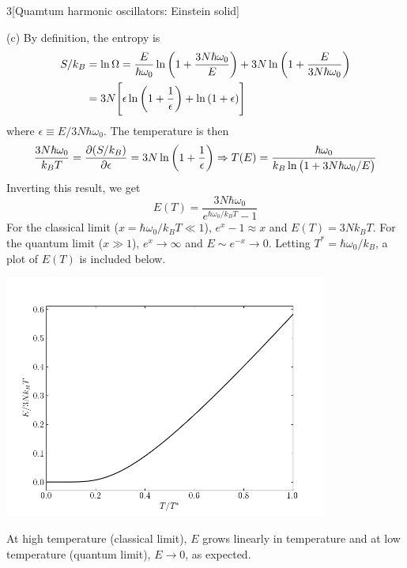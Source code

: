 \documentclass[12pt]{article}
\begin{document}
\begin{problem}{3}[Quamtum harmonic oscillators: Einstein solid]
\begin{solution}
(c) By definition, the entropy is
\begin{align}
    S/k_B
    &=\ln\Omega=\frac{E}{\hbar\omega_0}\ln\qty(1+\frac{3N\hbar\omega_0}{E})
    +3N\ln\qty(1+\frac{E}{3N\hbar\omega_0})\notag\\
    &=3N\qty[\epsilon\ln\qty(1+\frac{1}{\epsilon})+\ln\qty(1+\epsilon)]
\end{align}
where $\epsilon\equiv E/3N\hbar\omega_0$. The temperature is then
\begin{equation}
    \frac{3N\hbar\omega_0}{k_BT}=\frac{\partial(S/k_B)}{\partial\epsilon}
    =3N\ln\qty(1+\frac1\epsilon)
    \Rightarrow T(E)=\frac{\hbar\omega_0}{k_B\ln\qty(1+3N\hbar\omega_0/E)}
\end{equation}
Inverting this result, we get
\begin{equation}
    E(T)=\frac{3N\hbar\omega_0}{e^{\hbar\omega_0/k_BT}-1}
\end{equation}
For the classical limit ($x=\hbar\omega_0/k_BT\ll 1$), $e^x-1\approx x$
and $E(T)=3Nk_BT$. For the quantum limit ($x\gg 1$), $e^x\to\infty$ and
$E\sim e^{-x}\to0$. Letting $T^\ast=\hbar\omega_0/k_B$, a plot of $E(T)$ is 
included below.
\begin{center}
    \includegraphics[width=0.8\textwidth]{p3c.png} 
\end{center}
At high temperature (classical limit), $E$ grows linearly in temperature and at 
low temperature (quantum limit), $E\to0$, as expected.


\end{solution}
\end{problem}
\end{document}
